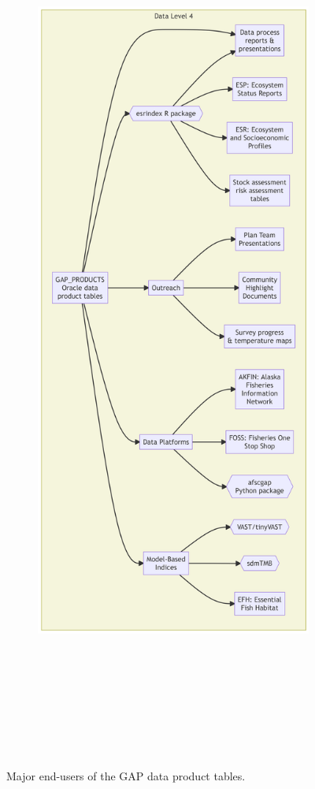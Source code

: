 \documentclass[
  letterpaper,
  oneside,
  open=any]{scrbook}
\begin{document}
\begin{figure}

{\centering 

\begin{figure}[H]

{\centering \includegraphics[width=6.54in,height=15.11in]{content/intro-workflow_files/figure-latex/mermaid-figure-2.png}

}

\end{figure}

}

\caption{\label{fig-data-used}Major end-users of the GAP data product
tables.}

\end{figure}
\end{document}
